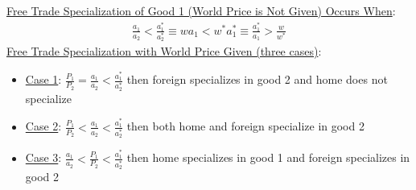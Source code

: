 \documentclass{article}
\begin{document}
\underline{Free Trade Specialization of Good 1 (World Price is Not Given) Occurs When}:
 \begin{gather*}
   \frac{a_{1}}{a_{2}} < \frac{a_{1}^{*}}{a_{2}^{*}} \equiv wa_{1} < w^{*}a_{1}^{*} \equiv \frac{a_{1}^{*}}{a_{1}} > \frac{w}{w^{*}}
 \end{gather*}
\underline{Free Trade Specialization with World Price Given (three cases)}:
\begin{itemize}
  \item  \underline{Case 1}: $\frac{P_{1}}{P_{2}} = \frac{a_{1}}{a_{2}} < \frac{a_{1}^{*}}{a_{2}^{*}}$ then foreign specializes in good 2 and home does not specialize
  \item  \underline{Case 2}: $\frac{P_{1}}{P_{2}} < \frac{a_{1}}{a_{2}} < \frac{a_{1}^{*}}{a_{2}^{*}}$ then both home and foreign specialize in good 2
  \item  \underline{Case 3}: $\frac{a_{1}}{a_{2}} < \frac{P_{1}}{P_{2}} < \frac{a_{1}^{*}}{a_{2}^{*}}$ then home specializes in good 1 and foreign specializes in good 2
\end{itemize}

\newpage
\end{document}
